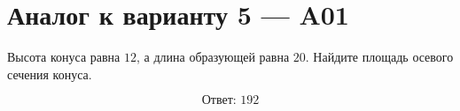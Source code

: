 \documentclass[12pt,a4paper]{article}
\begin{document}
\section*{Аналог к варианту 5 — A01}

Высота конуса равна \(12\), а длина образующей равна \(20\). Найдите площадь осевого сечения конуса.

\begin{center}
\end{center}

\[
\boxed{\text{Ответ: }192}
\]
\end{document}
